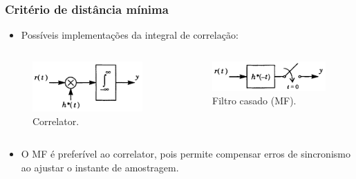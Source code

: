 \begin{frame}
	\frametitle{Critério de distância mínima}

	\begin{itemize}
	    \item Possíveis implementações da integral de correlação:
	\end{itemize}	
	\begin{columns}
		\begin{column}{0.45\textwidth}
		    \begin{figure}[t]	
		      \begin{center}
			\includegraphics[width=0.75\columnwidth]{figs/pam_25}
		      \end{center}\vspace{-0.1cm}
		      \caption{Correlator.}
		    \end{figure}
		\end{column}
		\begin{column}{0.45\textwidth}
		     \begin{figure}[t]	
		      \begin{center}
			\includegraphics[width=0.85\columnwidth]{figs/pam_26}
		      \end{center}\vspace{0.5cm}
		      \caption{Filtro casado (MF).}
		    \end{figure}
		\end{column}
	\end{columns}
	\begin{itemize}
	    \item O MF é preferível ao correlator, pois permite compensar erros de sincronismo ao ajustar o instante de amostragem.
	\end{itemize}
\end{frame}

